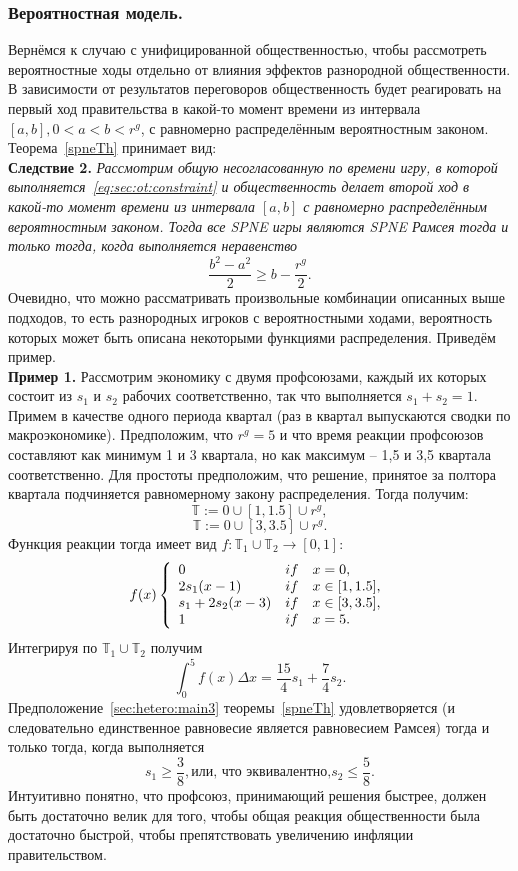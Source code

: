 \subsubsection{Вероятностная модель.}
Вернёмся к случаю с унифицированной общественностью, чтобы рассмотреть вероятностные ходы отдельно от влияния эффектов разнородной общественности. В зависимости от результатов переговоров общественность будет реагировать на первый ход правительства в какой-то момент времени из интервала $[a,b], 0< a < b < r^g$, с равномерно распределённым вероятностным законом. Теорема~\ref{spneTh} принимает вид:\\
\textbf{Следствие 2.} \textit{Рассмотрим общую несогласованную по времени игру, в которой выполняется~\eqref{eq:sec:ot:constraint} и общественность делает второй ход в какой-то момент времени из интервала $[a,b]$ с равномерно распределённым вероятностным законом. Тогда все SPNE игры являются SPNE Рамсея тогда и только тогда, когда выполняется неравенство
	\begin{equation}
	\label{sec:hetero:main5}
	\frac{b^2 - a^2}{2} \geqslant b - \frac{r^g}{2} .
	\end{equation}
}
Очевидно, что можно рассматривать произвольные комбинации описанных выше подходов, то есть разнородных игроков с вероятностными ходами, вероятность которых может быть описана некоторыми функциями распределения. Приведём пример.\\
\textbf{Пример 1.} Рассмотрим экономику с двумя профсоюзами, каждый их которых состоит из $s_1$ и $s_2$ рабочих соответственно, так что выполняется $s_1 + s_2 = 1$. Примем в качестве одного периода квартал (раз в квартал выпускаются сводки по макроэкономике). Предположим, что $r^g = 5$ и что время реакции профсоюзов составляют как минимум  1 и 3 квартала, но как максимум -- 1,5 и 3,5 квартала соответственно. Для простоты предположим, что решение, принятое за полтора квартала подчиняется равномерному закону распределения. Тогда получим:
$$ \mathbb{T} :={0} \cup [1, 1.5] \cup {r^g} ,$$
$$ \mathbb{T} :={0} \cup [3, 3.5] \cup {r^g} .$$
Функция реакции тогда имеет вид $f : \mathbb{T}_1\cup\mathbb{T}_2\to[0,1]$:
$$ f(x)\left\{  
\begin{array}{l c l}
0 & if & x = 0,\\
2s_1(x - 1) & if & x \in [1,1.5],\\
s_1 + 2s_2(x - 3) & if & x \in [3,3.5],\\
1 & if & x = 5.
\end{array} 
\right.$$
Интегрируя по $\mathbb{T}_1\cup\mathbb{T}_2$ получим
$$ \int_0^5 f(x) \Delta x = \frac{15}{4}s_1 + \frac{7}{4}s_2. $$
Предположение~\eqref{sec:hetero:main3} теоремы~\ref{spneTh} удовлетворяется (и следовательно единственное равновесие является равновесием Рамсея) тогда и только тогда, когда выполняется
$$ s_1 \geqslant \frac{3}{8}, \text{или, что эквивалентно,} s_2 \leqslant \frac{5}{8}. $$
Интуитивно понятно, что профсоюз, принимающий решения быстрее, должен быть достаточно велик для того, чтобы общая реакция общественности была достаточно быстрой, чтобы препятствовать увеличению инфляции правительством.

